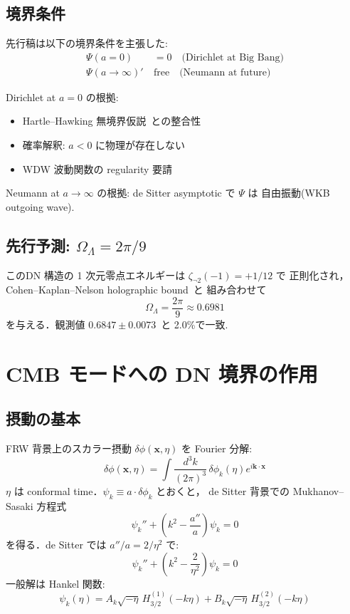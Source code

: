 \documentclass[11pt,a4paper]{article}
\begin{document}
\subsection{境界条件}

先行稿\cite{WDW-DN-paper}は以下の境界条件を主張した:
\begin{align}
\Psi(a = 0) &= 0\quad \text{(Dirichlet at Big Bang)}\\
\Psi(a \to \infty)'\ &\text{free}\quad \text{(Neumann at future)}
\end{align}

Dirichlet at $a=0$ の根拠:
\begin{itemize}
\item Hartle--Hawking 無境界仮説~\cite{HartleHawking1983}との整合性
\item 確率解釈: $a<0$ に物理が存在しない
\item WDW 波動関数の regularity 要請
\end{itemize}

Neumann at $a \to \infty$ の根拠: de Sitter asymptotic で $\Psi$ は
自由振動(WKB outgoing wave).

\subsection{先行予測: $\Omega_\Lambda = 2\pi/9$}

このDN 構造の 1 次元零点エネルギーは $\zeta_{\neg 2}(-1) = +1/12$ で
正則化され，Cohen--Kaplan--Nelson holographic bound~\cite{CKN1999}と
組み合わせて
\begin{equation}
\Omega_\Lambda = \frac{2\pi}{9} \approx 0.6981
\end{equation}
を与える．観測値 $0.6847 \pm 0.0073$~\cite{Planck2018}と 2.0\%で一致.

\section{CMB モードへの DN 境界の作用}

\subsection{摂動の基本}

FRW 背景上のスカラー摂動 $\delta\phi(\mathbf{x}, \eta)$ を Fourier
分解:
\begin{equation}
\delta\phi(\mathbf{x}, \eta) = \int\frac{d^3 k}{(2\pi)^3}\,
\delta\phi_k(\eta) e^{i\mathbf{k}\cdot\mathbf{x}}
\end{equation}
$\eta$ は conformal time．$\psi_k \equiv a\cdot\delta\phi_k$ とおくと，
de Sitter 背景での Mukhanov--Sasaki 方程式
\begin{equation}
\psi_k'' + \left(k^2 - \frac{a''}{a}\right)\psi_k = 0
\end{equation}
を得る．de Sitter では $a''/a = 2/\eta^2$ で:
\begin{equation}
\psi_k'' + \left(k^2 - \frac{2}{\eta^2}\right)\psi_k = 0
\end{equation}
一般解は Hankel 関数:
\begin{equation}\label{eq:general-solution}
\psi_k(\eta) = A_k \sqrt{-\eta}\, H_{3/2}^{(1)}(-k\eta)
+ B_k \sqrt{-\eta}\, H_{3/2}^{(2)}(-k\eta)
\end{equation}
\end{document}
